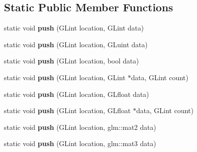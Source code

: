 \subsection*{Static Public Member Functions}
\begin{DoxyCompactItemize}
\item 
static void {\bfseries push} (G\+Lint location, G\+Lint data)\hypertarget{classflw_1_1flc_1_1Uniform_a212cd5958ac571eff65f862f1fce53e3}{}\label{classflw_1_1flc_1_1Uniform_a212cd5958ac571eff65f862f1fce53e3}

\item 
static void {\bfseries push} (G\+Lint location, G\+Luint data)\hypertarget{classflw_1_1flc_1_1Uniform_a36b4ff8d1242a9bfbaa7dd3ba27a101a}{}\label{classflw_1_1flc_1_1Uniform_a36b4ff8d1242a9bfbaa7dd3ba27a101a}

\item 
static void {\bfseries push} (G\+Lint location, bool data)\hypertarget{classflw_1_1flc_1_1Uniform_a51874d5a294d83bd91211907321bc5f1}{}\label{classflw_1_1flc_1_1Uniform_a51874d5a294d83bd91211907321bc5f1}

\item 
static void {\bfseries push} (G\+Lint location, G\+Lint $\ast$data, G\+Lint count)\hypertarget{classflw_1_1flc_1_1Uniform_a1b61578b090a9bd2f22427f99d4cb3af}{}\label{classflw_1_1flc_1_1Uniform_a1b61578b090a9bd2f22427f99d4cb3af}

\item 
static void {\bfseries push} (G\+Lint location, G\+Lfloat data)\hypertarget{classflw_1_1flc_1_1Uniform_ac20d2322e07f68173b05da46efb3be7b}{}\label{classflw_1_1flc_1_1Uniform_ac20d2322e07f68173b05da46efb3be7b}

\item 
static void {\bfseries push} (G\+Lint location, G\+Lfloat $\ast$data, G\+Lint count)\hypertarget{classflw_1_1flc_1_1Uniform_a9e453a3b388dc74fa1d46efbfe56ae68}{}\label{classflw_1_1flc_1_1Uniform_a9e453a3b388dc74fa1d46efbfe56ae68}

\item 
static void {\bfseries push} (G\+Lint location, glm\+::mat2 data)\hypertarget{classflw_1_1flc_1_1Uniform_ac8bdc4548e563192bfec2dd8d86549b0}{}\label{classflw_1_1flc_1_1Uniform_ac8bdc4548e563192bfec2dd8d86549b0}

\item 
static void {\bfseries push} (G\+Lint location, glm\+::mat3 data)\hypertarget{classflw_1_1flc_1_1Uniform_aee5e184bf60d8fcffea74997b98fad47}{}\label{classflw_1_1flc_1_1Uniform_aee5e184bf60d8fcffea74997b98fad47}


\end{DoxyCompactItemize}
